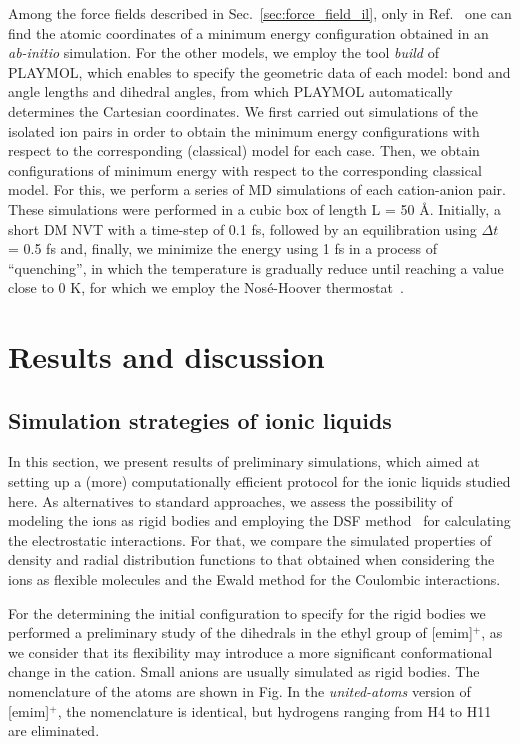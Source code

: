 \documentclass[3p,twocolumn]{elsarticle}
\begin{document}
Among the force fields described in Sec.~\ref{sec:force_field_il}, only in Ref.~ one can find the atomic coordinates of a minimum energy configuration obtained in an \textit{ab-initio} simulation. For the other models, we employ the tool \textit{build} of PLAYMOL, which enables to specify the geometric data of each model: bond and angle lengths and dihedral angles, from which PLAYMOL automatically determines the Cartesian coordinates. We first carried out simulations of the isolated ion pairs in order to obtain the minimum energy configurations with respect to the corresponding (classical) model for each case. Then, we obtain configurations of minimum energy with respect to the corresponding classical model. For this, we perform a series of MD simulations of each cation-anion pair. These simulations were performed in a cubic box of length L = 50 {\AA}. Initially, a short DM NVT with a time-step of 0.1 fs, followed by an equilibration using $\Delta t$ = 0.5 fs and, finally, we minimize the energy using 1 fs in a process of ``quenching'', in which the temperature is gradually reduce until reaching a value close to 0 K, for which we employ the Nos\'{e}-Hoover thermostat~\cite{Martyna1992}.

\section{Results and discussion}
\label{sec:results}

\subsection{Simulation strategies of ionic liquids}
\label{sec:prel_results}

In this section, we present results of preliminary simulations, which aimed at setting up a (more) computationally efficient protocol for the ionic liquids studied here. As alternatives to standard approaches, we assess the possibility of modeling the ions as rigid bodies and employing the DSF method~\cite{Fennell2006} for calculating the electrostatic interactions. For that, we compare the simulated properties of density and radial distribution functions to that obtained when considering the ions as flexible molecules and the Ewald method for the Coulombic interactions.

For the determining the initial configuration to specify for the rigid bodies we performed a preliminary study of the dihedrals in the ethyl group of [emim]$^{+}$, as we consider that its flexibility  may introduce a more significant conformational change in the cation. Small anions are usually simulated as rigid bodies. The nomenclature of the atoms are shown in Fig. In the \textit{united-atoms} version of [emim]$^{+}$,  the nomenclature is identical, but hydrogens ranging from H4 to H11 are eliminated.
\end{document}
